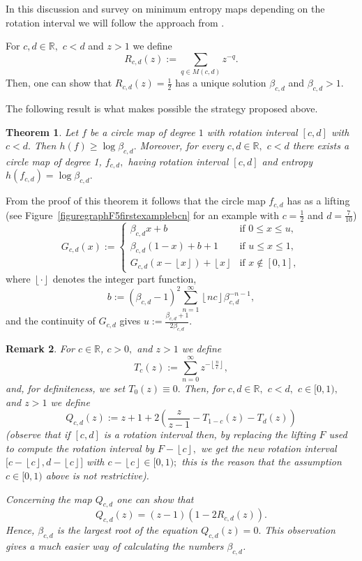 \documentclass[a4paper, 11pt]{amsart}
\numberwithin{equation}{section}
\newtheorem{theorem}{Theorem}[section]
\theoremstyle{customnumberedtheorem}
\theoremstyle{definitionwithbfnote}
\newtheorem{remark}[theorem]{Remark}
\newcommand{\R}{\ensuremath{\mathbb{R}}}
\newcommand{\floor}[1]{\ensuremath{\left\lfloor #1 \right\rfloor}}
\begin{document}
In this discussion and survey on minimum entropy maps
depending on the rotation interval we will follow the approach from
\cite{almm, alm}.

For $c,d \in \R,$ $c < d$ and $z > 1$ we define
\[
R_{c,d}(z) := \sum_{q \in M(c,d)} z^{-q}.
\]
Then, one can show that $R_{c,d}(z) = \tfrac{1}{2}$ has a unique solution
$\beta_{c,d}$ and $\beta_{c,d} > 1.$

The following result is what makes possible the strategy proposed above.

\begin{theorem}\label{LBE}
Let $f$ be a circle map of degree $1$ with rotation interval $[c,d]$
with $c<d.$ Then $h(f) \ge \log \beta_{c,d}.$
Moreover, for every $c,d \in \R,$ $c < d$
there exists a circle map of degree 1, $f_{c,d},$
having rotation interval $[c,d]$ and entropy
$h(f_{c,d}) = \log \beta_{c,d}.$
\end{theorem}

From the proof of this theorem it follows that
the circle map $f_{c,d}$
has as a lifting (see Figure~\ref{figuregraphF5firstexamplebcn}
for an example with $c = \tfrac{1}{2}$ and $d = \tfrac{7}{10}$)
\[
  G_{c,d}(x) := \begin{cases}
                  \beta_{c,d} x + b & \text{if $0 \le x \le u,$} \\
                  \beta_{c,d} (1-x) + b + 1 & \text{if $u \le x \le 1,$} \\
                  G_{c,d}(x - \floor{x}) + \floor{x} & \text{if $x \notin [0,1],$}
                \end{cases}
\]
where $\floor{\cdot}$ denotes the integer part function,
\[
   b := (\beta_{c,d}-1)^2 \sum_{n=1}^{\infty} \floor{nc} \beta_{c,d}^{-n-1},
\]
and the continuity of $G_{c,d}$ gives $u := \tfrac{\beta_{c,d} + 1}{2\beta_{c,d}}.$


\begin{remark}
For $c\in \R$, $c > 0,$ and $z > 1$ we define
\[
T_c(z) := \sum_{n=0}^\infty z^{-\floor{\tfrac{n}{c}}},
\]
and, for definiteness, we set $T_0(z) \equiv 0.$
Then, for $c,d \in \R,$ $c < d,$ $c \in [0,1),$ and $z > 1$ we define
\[
  Q_{c,d}(z) := z + 1 + 2\left(\frac{z}{z-1} - T_{1-c}(z) - T_{d}(z)\right)
\]
(observe that if $[c,d]$ is a rotation interval then, by replacing the
lifting $F$ used to compute the rotation interval by
$F - \floor{c},$ we get the new rotation interval
$\bigl[c-\floor{c},d-\floor{c}\bigr]$
with $c-\floor{c} \in [0,1);$
this is the reason that the assumption $c \in [0,1)$ above is not
restrictive).

Concerning the map $Q_{c,d}$ one can show that
\[
   Q_{c,d}(z) = (z -1) \left(1 - 2R_{c,d}(z)\right).
\]
Hence, $\beta_{c,d}$ is the largest root of the equation
$Q_{c,d}(z) = 0.$
This observation gives a much easier way of calculating the numbers
$\beta_{c,d}$.
\end{remark}
\end{document}
